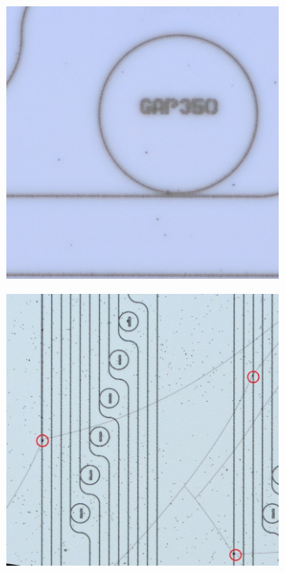 \begin{figure}
    \centering
    \begin{subfigure}[b]{0.45\textwidth}
    \includegraphics[width=\textwidth]{imgs/jpg/LS_ac}
    \caption{}
    \end{subfigure}
    \begin{subfigure}[b]{0.45\textwidth}
    \includegraphics[width=\textwidth]{imgs/jpg/LS_tc}

\end{subfigure}
\end{figure}
